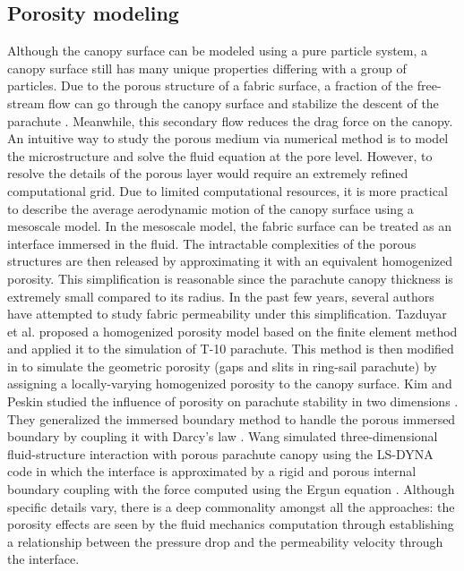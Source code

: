 \subsection{Porosity modeling}
Although the canopy surface can be modeled using a pure particle system, a canopy surface still has many unique properties differing with a group of particles. 
Due to the porous structure of a
fabric surface, a fraction of the free-stream flow can go through the canopy
surface and stabilize the descent of the parachute \cite{Johari05}. 
Meanwhile, this secondary flow reduces the drag force on the canopy. 
An intuitive way to study the porous medium via numerical method is to model the microstructure and solve the fluid equation at the pore level. However, to resolve the details of the porous layer would require an extremely 
refined computational grid. Due to limited computational resources, it 
is more practical to describe the average aerodynamic motion of the 
canopy surface using a mesoscale model. In the mesoscale model, the 
fabric surface can be treated as an interface immersed in the fluid.
The intractable complexities of the porous structures are then released by 
approximating it with an equivalent homogenized porosity.  
This simplification is reasonable since the parachute canopy thickness is
extremely small compared to its radius. In the past few years, 
several authors have attempted to study fabric permeability
under this simplification. Tazduyar et al. \cite{TezduyarSathe2007IJNMF} proposed a
homogenized porosity model based on the finite element method and applied it 
to the simulation of T-10 parachute. This method is then modified in \cite{Takizawa2012ACME}
to simulate the geometric porosity (gaps and slits in ring-sail parachute) by assigning a locally-varying homogenized porosity to the canopy surface. 
Kim and Peskin studied the influence of porosity on
parachute stability in two dimensions \cite{kim2006twodim}. They generalized
the immersed boundary method to handle the porous immersed boundary by 
coupling it with Darcy's law \cite{nield2013}.  Wang \cite{wang2006porous} simulated 
three-dimensional fluid-structure interaction with porous parachute canopy using the
LS-DYNA code in which the interface is approximated by a rigid and porous
internal boundary coupling with the force computed using the Ergun equation \cite{nield2013}. Although specific details vary, there is a deep commonality amongst all the approaches: the porosity effects are seen by the fluid mechanics computation through establishing a relationship between the pressure drop and the permeability velocity through the interface.

